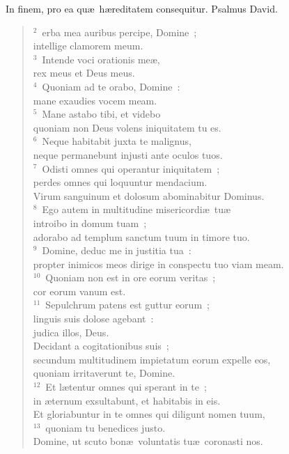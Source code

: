 \bchapter[Psalm]
In finem, pro ea qu\ae\ h\ae reditatem consequitur. Psalmus David.
\begin{verse}${}^{2}$~erba mea auribus percipe, Domine~;\\ intellige clamorem meum.\\
${}^{3}$~Intende voci orationis me\ae ,\\ rex meus et Deus meus.\\
${}^{4}$~Quoniam ad te orabo, Domine~:\\ mane exaudies vocem meam.\\
${}^{5}$~Mane astabo tibi, et videbo\\ quoniam non Deus volens iniquitatem tu es.\\
${}^{6}$~Neque habitabit juxta te malignus,\\ neque permanebunt injusti ante oculos tuos.\\
${}^{7}$~Odisti omnes qui operantur iniquitatem~;\\ perdes omnes qui loquuntur mendacium.\\ Virum sanguinum et dolosum abominabitur Dominus.\\
${}^{8}$~Ego autem in multitudine misericordi\ae\ tu\ae \\ introibo in domum tuam~;\\ adorabo ad templum sanctum tuum in timore tuo.\\
${}^{9}$~Domine, deduc me in justitia tua~:\\ propter inimicos meos dirige in conspectu tuo viam meam.\\
${}^{10}$~Quoniam non est in ore eorum veritas~;\\ cor eorum vanum est.\\
${}^{11}$~Sepulchrum patens est guttur eorum~;\\ linguis suis dolose agebant~:\\ judica illos, Deus.\\ Decidant a cogitationibus suis~;\\ secundum multitudinem impietatum eorum expelle eos,\\ quoniam irritaverunt te, Domine.\\
${}^{12}$~Et l\ae tentur omnes qui sperant in te~;\\ in \ae ternum exsultabunt, et habitabis in eis.\\ Et gloriabuntur in te omnes qui diligunt nomen tuum,\\
${}^{13}$~quoniam tu benedices justo.\\ Domine, ut scuto bon\ae\ voluntatis tu\ae\ coronasti nos.\end{verse}



